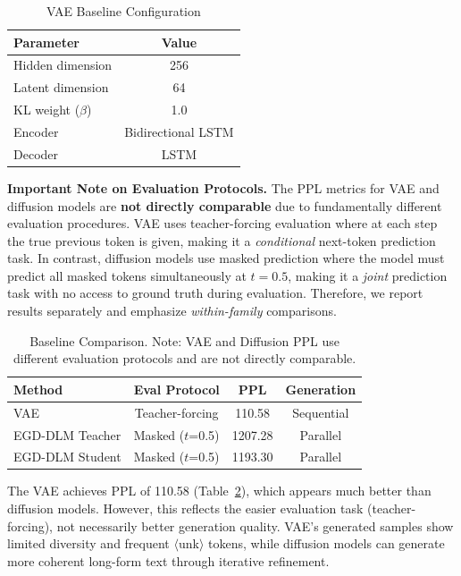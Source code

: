 \documentclass[conference]{IEEEtran}
\begin{document}
\begin{table}[h]
\centering
\caption{VAE Baseline Configuration}
\label{tab:vae_config}
\begin{tabular}{lc}
\toprule
\textbf{Parameter} & \textbf{Value} \\
\midrule
Hidden dimension & 256 \\
Latent dimension & 64 \\
KL weight ($\beta$) & 1.0 \\
Encoder & Bidirectional LSTM \\
Decoder & LSTM \\
\bottomrule
\end{tabular}
\end{table}

\textbf{Important Note on Evaluation Protocols.} The PPL metrics for VAE and diffusion models are \textbf{not directly comparable} due to fundamentally different evaluation procedures. VAE uses teacher-forcing evaluation where at each step the true previous token is given, making it a \textit{conditional} next-token prediction task. In contrast, diffusion models use masked prediction where the model must predict all masked tokens simultaneously at $t=0.5$, making it a \textit{joint} prediction task with no access to ground truth during evaluation. Therefore, we report results separately and emphasize \textit{within-family} comparisons.

\begin{table}[t]
\centering
\caption{Baseline Comparison. Note: VAE and Diffusion PPL use different evaluation protocols and are not directly comparable.}
\label{tab:baselines}
\begin{tabular}{lccc}
\toprule
\textbf{Method} & \textbf{Eval Protocol} & \textbf{PPL} & \textbf{Generation} \\
\midrule
VAE & Teacher-forcing & 110.58 & Sequential \\
EGD-DLM Teacher & Masked ($t$=0.5) & 1207.28 & Parallel \\
EGD-DLM Student & Masked ($t$=0.5) & 1193.30 & Parallel \\
\bottomrule
\end{tabular}
\end{table}

The VAE achieves PPL of 110.58 (Table~\ref{tab:baselines}), which appears much better than diffusion models. However, this reflects the easier evaluation task (teacher-forcing), not necessarily better generation quality. VAE's generated samples show limited diversity and frequent $\langle$unk$\rangle$ tokens, while diffusion models can generate more coherent long-form text through iterative refinement.
\end{document}
